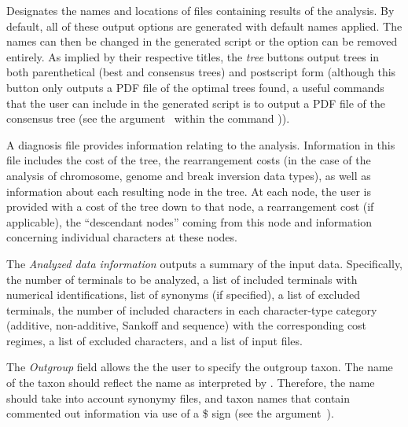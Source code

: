 \begin{description}
\setlength{\parindent}{0.5cm}	   
        \item[Output Files]
        		Designates the names and locations of files containing results of the analysis. 
        		By default, all of these output options are generated with default names applied.  The names can 
      		then be changed in the generated script or the option can be removed entirely.  As implied by their 
        		respective titles, the \emph{tree} buttons output trees in both parenthetical (best and 
        		consensus trees) and postscript form (although this button only outputs a PDF file of the optimal trees
		found, a useful commands that the user can include in the generated script is to output 
		a PDF file of the consensus tree (see the argument~ 
		within the command )). 
        
        		\indent A diagnosis file provides information relating to the analysis. Information in this file includes 
		the cost of the tree, the rearrangement costs (in the case of the analysis of chromosome, genome and 
		break inversion data types), as well as information about each resulting node in the tree.  At each node, 
		the user is provided with a cost of the tree down to that node, a rearrangement cost (if applicable), the ``descendant nodes'' 
		coming from this node and information concerning individual characters at these nodes.
		
		\indent The \emph{Analyzed data information} outputs a summary of the input data. Specifically, 
		the number of terminals to be analyzed, a list of included terminals with numerical identifications, 
		list of synonyms (if specified), a list of excluded terminals, the number of included characters in each 
		character-type category (additive, non-additive, Sankoff and sequence) with the corresponding cost 
		regimes, a list of excluded characters, and a list of input files.    
		
		\indent The \emph{Outgroup} field allows the the user to specify the outgroup taxon.  The name of the taxon
		should reflect the name as interpreted by \poy.  Therefore, the name should take into account synonymy files, 
		and taxon names that contain commented out information via use of a \$ sign (see the argument~).
\end{description}


